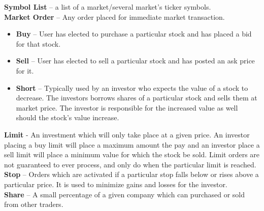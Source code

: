 {\textbf{Symbol List} -- a list of a market/several market's ticker symbols.\\


\textbf{Market Order} -- Any order placed for immediate market transaction.\\

\begin{itemize}
    \item \textbf{Buy} -- User has elected to purchase a particular stock and has placed
    a bid for that stock.\\

    \item \textbf{Sell} -- User has elected to sell a particular stock and has posted an
    ask price for it.\\

    \item \textbf{Short} -- Typically used by an investor who expects the value of
    a stock to decrease. The investors borrows shares of a particular stock and sells
    them at market price. The investor is responsible for the increased value as well
    should the stock's value increase.\cite{inv:short}\\
    \end{itemize}

\textbf{Limit} - An investment which will only take place at a given price. An
investor placing a buy limit will place a maximum amount the pay and an investor
place a sell limit will place a minimum value for which the stock be sold. Limit
orders are not guaranteed to ever process, and only do when the particular limit
is reached.\cite{inv:limit}\\

\textbf{Stop} -- Orders which are activated if a particular stop falls below or
rises above a particular price. It is used to minimize gains and losses for the
investor.\cite{inv:stop}\\

\textbf{Share} -- A small percentage of a given company which can purchased or
sold from other traders.\\
}

